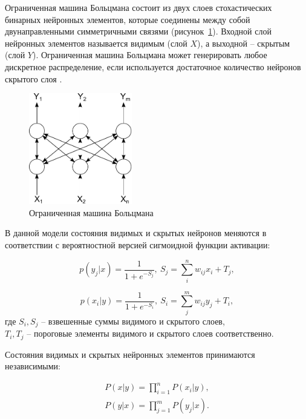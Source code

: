 Ограниченная машина Больцмана состоит из двух слоев стохастических бинарных нейронных элементов, которые соединены между собой двунаправленными симметричными связями (рисунок~\ref{fig:pic1_3}). Входной слой нейронных элементов называется видимым (слой $X$), а выходной -- скрытым (слой $Y$). Ограниченная машина Больцмана может генерировать любое дискретное распределение, если используется достаточное количество нейронов скрытого слоя \cite{n5}.

\begin{figure}[H]
  \centering
  \includegraphics[width=0.4\textwidth]{man-source/images/ch1/pic1-3.pdf}
  \caption{Ограниченная машина Больцмана}
  \label{fig:pic1_3}
\end{figure}	

В данной модели состояния видимых и скрытых нейронов меняются в соответствии с вероятностной версией сигмоидной функции активации:
	
\begin{equation}
	p(y_j\lvert x)=\frac{1}{1+e^{-S_j}},\ S_j=\sum_i^n w_{ij}x_i+T_j,
\end{equation}
	
\begin{equation}
	p(x_i\lvert y)=\frac{1}{1+e^{-S_i}},\ S_i=\sum_j^m w_{ij}y_j+T_i,
\end{equation}
где $S_i, S_j$ -- взвешенные суммы видимого и скрытого слоев,\\
$T_i, T_j$ -- пороговые элементы видимого и скрытого слоев соответственно.
	
Состояния видимых и скрытых нейронных элементов принимаются независимыми:
	
\begin{equation*}
\begin{aligned}
	P(x \lvert y) = \prod_{i=1}^n P(x_i \lvert y),\\
	P(y \lvert x) = \prod_{j=1}^m P(y_j \lvert x).
\end{aligned}	
\end{equation*}
	
